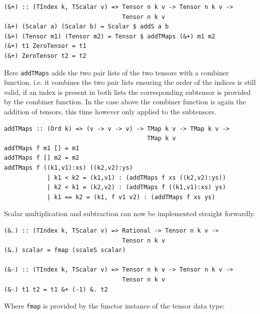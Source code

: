 \documentclass[a4paper,12pt, DIV=14, BCOR=5mm, twoside, headsepline]{scrbook}
\begin{document}
\begin{samepage} 
\begin{verbatim}
(&+) :: (TIndex k, TScalar v) => Tensor n k v -> Tensor n k v -> 
                                 Tensor n k v 
(&+) (Scalar a) (Scalar b) = Scalar $ addS a b 
(&+) (Tensor m1) (Tensor m2) = Tensor $ addTMaps (&+) m1 m2     
(&+) t1 ZeroTensor = t1
(&+) ZeroTensor t2 = t2 
\end{verbatim} 
\end{samepage}

Here \texttt{addTMaps} adds the two pair lists of the two tensors with a combiner function, i.e. it combines the two pair lists ensuring the order of the indices is still valid, if an index is present in both lists the corresponding subtensor is provided by the combiner function. In the case above the combiner function is again the addition of tensors, this time however only applied to the subtensors. 

\begin{samepage} 
\begin{verbatim}
addTMaps :: (Ord k) => (v -> v -> v) -> TMap k v -> TMap k v ->
                                        TMap k v 
addTMaps f m1 [] = m1 
addTMaps f [] m2 = m2 
addTMaps f ((k1,v1):xs) ((k2,v2):ys) 
            | k1 < k2 = (k1,v1) : (addTMaps f xs ((k2,v2):ys))
            | k2 < k1 = (k2,v2) : (addTMaps f ((k1,v1):xs) ys)
            | k1 == k2 = (k1, f v1 v2) : (addTMaps f xs ys) 
\end{verbatim} 
\end{samepage}

Scalar multiplication and subtraction can now be implemented straight forwardly.

\begin{samepage} 
\begin{verbatim}
(&.) :: (TIndex k, TScalar v) => Rational -> Tensor n k v ->
                                 Tensor n k v 
(&.) scalar = fmap (scaleS scalar)

(&-) :: (TIndex k, TScalar v) => Tensor n k v -> Tensor n k v ->
                                 Tensor n k v
(&-) t1 t2 = t1 &+ (-1) &. t2 
\end{verbatim} 
\end{samepage}

Where \texttt{fmap} is provided by the functor instance of the tensor data type:
\end{document}
